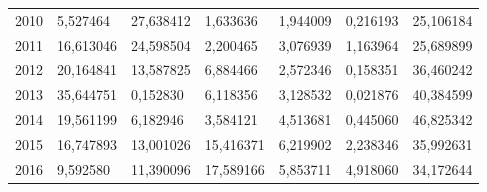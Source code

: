 \begin{table}
\begin{tabular}{p{1cm}p{2cm}p{2cm}p{2cm}p{2cm}p{2cm}p{2cm}}
 2010 &               5,527464 &                          27,638412 &                       1,633636 &                                     1,944009 &      0,216193 & 25,106184 \\
 2011 &              16,613046 &                          24,598504 &                       2,200465 &                                     3,076939 &      1,163964 & 25,689899 \\
 2012 &              20,164841 &                          13,587825 &                       6,884466 &                                     2,572346 &      0,158351 & 36,460242 \\
 2013 &              35,644751 &                           0,152830 &                       6,118356 &                                     3,128532 &      0,021876 & 40,384599 \\
 2014 &              19,561199 &                           6,182946 &                       3,584121 &                                     4,513681 &      0,445060 & 46,825342 \\
 2015 &              16,747893 &                          13,001026 &                      15,416371 &                                     6,219902 &      2,238346 & 35,992631 \\
 2016 &               9,592580 &                          11,390096 &                      17,589166 &                                     5,853711 &      4,918060 & 34,172644 \\
\bottomrule
\end{tabular}
\end{table}
